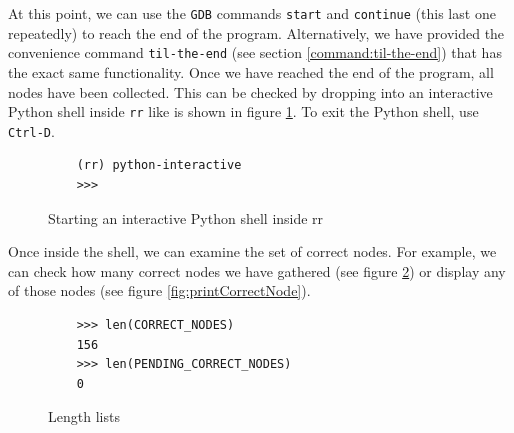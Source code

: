 At this point, we can use the \verb|GDB| commands \verb|start| and \verb|continue| (this last one repeatedly) to reach the end of the program.
Alternatively, we have provided the convenience command \verb|til-the-end| (see section \ref{command:til-the-end}) that has the exact same functionality.
Once we have reached the end of the program, all nodes have been collected. This can be checked by dropping into an interactive Python shell inside \verb|rr| like is shown in figure \ref{fig:python-interactive}. To exit the Python shell, use \verb|Ctrl-D|.
\begin{figure}[h]
    \centering
    \caption{Starting an interactive Python shell inside rr}
    \label{fig:python-interactive}
    \begin{verbatim}
    (rr) python-interactive
    >>>
    \end{verbatim}
\end{figure}
Once inside the shell, we can examine the set of correct nodes. For example, we can check how many correct nodes we have gathered (see figure \ref{fig:lengthLists}) or display any of those nodes (see figure \ref{fig:printCorrectNode}).
\begin{figure}[h]
    \centering
    \caption{Length lists}
    \label{fig:lengthLists}
    \begin{verbatim}
    >>> len(CORRECT_NODES)
    156
    >>> len(PENDING_CORRECT_NODES)
    0
    \end{verbatim}
\end{figure}


